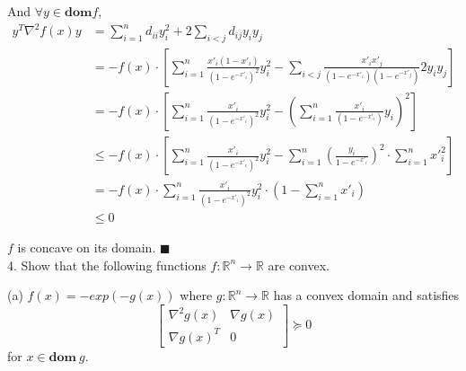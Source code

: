 \documentclass{article}
\begin{document}
And $\forall y \in \textbf{dom}f$,
\begin{align*}
	y^T \nabla^2f(x) y &= \sum_{i=1}^n d_{ii}y_i^2 + 2\sum_{i<j}d_{ij}{y_i y_j} \\
	&= -f(x) \cdot 
		[
			\sum_{i=1}^n \frac{x'_i(1-x'_i)}{(1-e^{-x'_i})^2} y_i^2 -
			\sum_{i<j} \frac{x'_i x'_j}{(1-e^{-x'_i})(1-e^{-x'_j})} {2 y_i y_j}
		] \\
	&= -f(x) \cdot
		[
			\sum_{i=1}^n \frac{x'_i}{(1-e^{-x'_i})^2} y_i^2 -
			(\sum_{i=1}^n \frac{x'_i}{(1-e^{-x'_i})} y_i)^2
		] \\
	&\leq -f(x) \cdot
		[
			\sum_{i=1}^n \frac{x'_i}{(1-e^{-x'_i})^2} y_i^2 -
			\sum_{i=1}^n (\frac{y_i}{1-e^{-x'_i}})^2 \cdot
			\sum_{i=1}^n x'^2_i
		] \\
	&= -f(x) \cdot
		\sum_{i=1}^n \frac{x'_i}{(1-e^{-x'_i})^2} y_i^2
			\cdot (1-\sum_{i=1}^n x'_i) \\
	&\leq 0
\end{align*}


$f$ is concave on its domain. $\blacksquare$ \\

4. Show that the following functions $f:\mathbb{R}^n\to\mathbb{R}$ are convex.

(a) $f(x)=-exp(-g(x))$ where $g:\mathbb{R}^n\to\mathbb{R}$ has a convex domain and satisfies
\[
	\begin{bmatrix}
		\nabla^2 g(x) & \nabla g(x) \\
		\nabla g(x)^T & 0
	\end{bmatrix}
	\succeq 0
\]
for $x \in \textbf{dom}\ g$. \\
\end{document}

